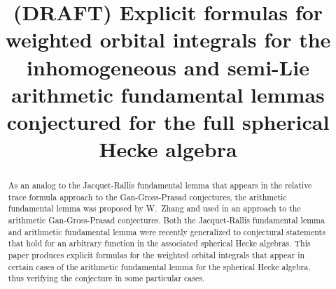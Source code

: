 \documentclass[twoside]{mitthesis}
\begin{document}
\title{(DRAFT) Explicit formulas for weighted orbital integrals for the
  inhomogeneous and semi-Lie arithmetic fundamental lemmas
  conjectured for the full spherical Hecke algebra}



\maketitle

\begin{abstract}
  As an analog to the Jacquet-Rallis fundamental lemma that appears in the
  relative trace formula approach to the Gan-Gross-Prasad conjectures,
  the arithmetic fundamental lemma was proposed by W.\ Zhang and used in an approach
  to the arithmetic Gan-Gross-Prasad conjectures.
  Both the Jacquet-Rallis fundamental lemma and arithmetic fundamental lemma
  were recently generalized to conjectural statements that hold
  for an arbitrary function in the associated spherical Hecke algebras.
  This paper produces explicit formulas for the weighted orbital integrals that appear
  in certain cases of the arithmetic fundamental lemma for the spherical Hecke algebra,
  thus verifying the conjecture in some particular cases.
\end{abstract}

\onehalfspacing %



\tableofcontents
\listoffigures
\listoftables

















\printbibliography[title=References,heading=bibintoc]

\appendix
\end{document}
